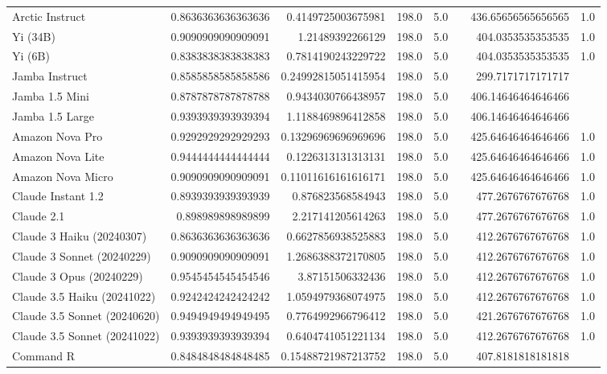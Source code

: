 \begin{table}[htp]
{\begin{tabular}{lrrrrrrr}
Arctic Instruct & 0.8636363636363636 & 0.4149725003675981 & 198.0 & 5.0 &  & 436.65656565656565 & 1.0 \\
Yi (34B) & 0.9090909090909091 & 1.21489392266129 & 198.0 & 5.0 &  & 404.0353535353535 & 1.0 \\
Yi (6B) & 0.8383838383838383 & 0.7814190243229722 & 198.0 & 5.0 &  & 404.0353535353535 & 1.0 \\
Jamba Instruct & 0.8585858585858586 & 0.24992815051415954 & 198.0 & 5.0 &  & 299.7171717171717 &  \\
Jamba 1.5 Mini & 0.8787878787878788 & 0.9434030766438957 & 198.0 & 5.0 &  & 406.14646464646466 &  \\
Jamba 1.5 Large & 0.9393939393939394 & 1.1188469896412858 & 198.0 & 5.0 &  & 406.14646464646466 &  \\
Amazon Nova Pro & 0.9292929292929293 & 0.13296969696969696 & 198.0 & 5.0 &  & 425.64646464646466 & 1.0 \\
Amazon Nova Lite & 0.9444444444444444 & 0.1226313131313131 & 198.0 & 5.0 &  & 425.64646464646466 & 1.0 \\
Amazon Nova Micro & 0.9090909090909091 & 0.11011616161616171 & 198.0 & 5.0 &  & 425.64646464646466 & 1.0 \\
Claude Instant 1.2 & 0.8939393939393939 & 0.876823568584943 & 198.0 & 5.0 &  & 477.2676767676768 & 1.0 \\
Claude 2.1 & 0.898989898989899 & 2.217141205614263 & 198.0 & 5.0 &  & 477.2676767676768 & 1.0 \\
Claude 3 Haiku (20240307) & 0.8636363636363636 & 0.6627856938525883 & 198.0 & 5.0 &  & 412.2676767676768 & 1.0 \\
Claude 3 Sonnet (20240229) & 0.9090909090909091 & 1.2686388372170805 & 198.0 & 5.0 &  & 412.2676767676768 & 1.0 \\
Claude 3 Opus (20240229) & 0.9545454545454546 & 3.87151506332436 & 198.0 & 5.0 &  & 412.2676767676768 & 1.0 \\
Claude 3.5 Haiku (20241022) & 0.9242424242424242 & 1.0594979368074975 & 198.0 & 5.0 &  & 412.2676767676768 & 1.0 \\
Claude 3.5 Sonnet (20240620) & 0.9494949494949495 & 0.7764992966796412 & 198.0 & 5.0 &  & 421.2676767676768 & 1.0 \\
Claude 3.5 Sonnet (20241022) & 0.9393939393939394 & 0.6404741051221134 & 198.0 & 5.0 &  & 412.2676767676768 & 1.0 \\
Command R & 0.8484848484848485 & 0.15488721987213752 & 198.0 & 5.0 &  & 407.8181818181818 &  \\

\end{tabular}}
\end{table}
